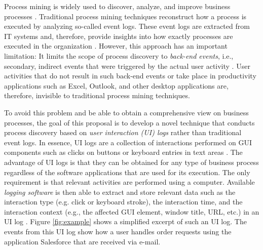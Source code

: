 \label{sec:startingpoint}

Process mining is widely used to discover, analyze, and improve business processes \cite{van2016data}. Traditional process mining techniques reconstruct how a process is executed by analyzing so-called event logs. These event logs are extracted from IT systems and, therefore, provide insights into how exactly processes are executed in the organization . However, this approach has an important limitation: It limits the scope of process discovery to \textit{back-end events}, i.e., secondary, indirect events that were triggered by the actual user activity \cite{diba2020extraction}. User activities that do not result in such back-end events or take place in productivity applications such as Excel, Outlook, and other desktop applications are, therefore, invisible to traditional process mining techniques. 

To avoid this problem and be able to obtain a comprehensive view on business processes, the goal of this proposal is to develop a novel technique that conducts process discovery based on \textit{user interaction (UI) logs} rather than traditional event logs. In essence, UI logs are a collection of interactions performed on GUI components such as clicks on buttons or keyboard entries in text areas \cite{Urabe21}. The advantage of UI logs is that they can be obtained for any type of business process regardless of the software applications that are used for its execution. The only requirement is that relevant activities are performed using a computer. Available \textit{logging software} is then able to extract and store relevant data such as the interaction type (e.g. click or keyboard stroke), the interaction time, and the interaction context (e.g., the affected GUI element, window title, URL, etc.) in an UI log  \cite{leno2019action}. Figure \ref{fig:example} shows a simplified excerpt of such an UI log. The events from this UI log show how a user handles order requests using the application Salesforce that are received via e-mail. 

